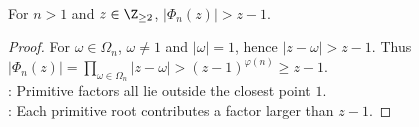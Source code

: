 \begin{lemma} \label{lem:cyclotomic-size-estimate-for-wedderburn} \\
For $n>1$ and $z\in\Z_{\geq2}$, $|\Phi_n(z)|>z-1$.
\begin{proof}
For $\omega\in\Omega_n$, $\omega\neq1$ and $|\omega|=1$, hence $|z-\omega|>z-1$. Thus $|\Phi_n(z)|=\prod\limits_{\omega\in\Omega_n}|z-\omega|>(z-1)^{\varphi(n)}\geq z-1$.\\
: Primitive factors all lie outside the closest point $1$.\\
: Each primitive root contributes a factor larger than $z-1$.
\end{proof}
\end{lemma}
